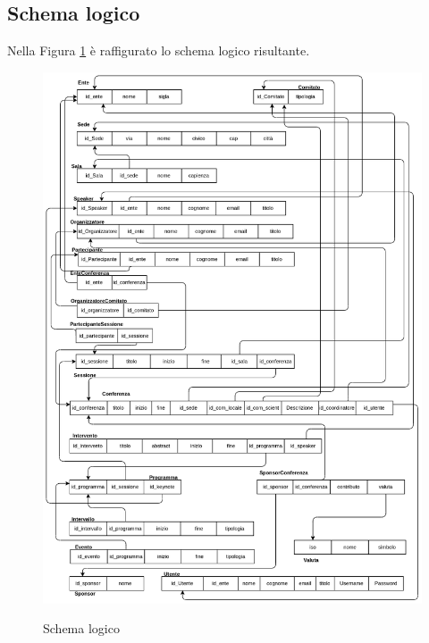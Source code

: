 \subsection{Schema logico}
Nella Figura \ref{fig:schema_logico} è raffigurato lo schema logico risultante.
\begin{figure}
	\centering
	\caption{Schema logico}
	\includegraphics[scale=0.6]{Immagini/Schema_logico.png}\label{fig:schema_logico}
	
\end{figure}